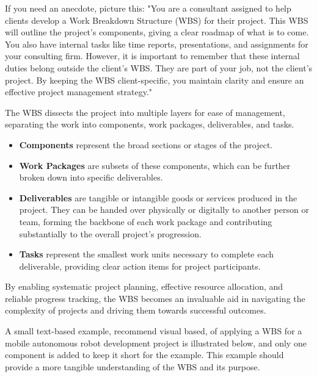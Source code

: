 \documentclass[10pt]{projectdoc}
\begin{document}
If you need an anecdote, picture this: "You are a consultant assigned to help clients develop a Work Breakdown Structure (WBS) for their project. This WBS will outline the project's components, giving a clear roadmap of what is to come. You also have internal tasks like time reports, presentations, and assignments for your consulting firm. However, it is important to remember that these internal duties belong outside the client's WBS. They are part of your job, not the client's project. By keeping the WBS client-specific, you maintain clarity and ensure an effective project management strategy."

The WBS dissects the project into multiple layers for ease of management, separating the work into components, work packages, deliverables, and tasks.

\begin{itemize}
\item \textbf{Components} represent the broad sections or stages of the project.
\item \textbf{Work Packages} are subsets of these components, which can be further broken down into specific deliverables.
\item \textbf{Deliverables} are tangible or intangible goods or services produced in the project. They can be handed over physically or digitally to another person or team, forming the backbone of each work package and contributing substantially to the overall project's progression.
\item \textbf{Tasks} represent the smallest work units necessary to complete each deliverable, providing clear action items for project participants.
\end{itemize}

By enabling systematic project planning, effective resource allocation, and reliable progress tracking, the WBS becomes an invaluable aid in navigating the complexity of projects and driving them towards successful outcomes.

A small text-based example, recommend visual based, of applying a WBS for a mobile autonomous robot development project is illustrated below, and only one component is added to keep it short for the example. This example should provide a more tangible understanding of the WBS and its purpose.
\end{document}
